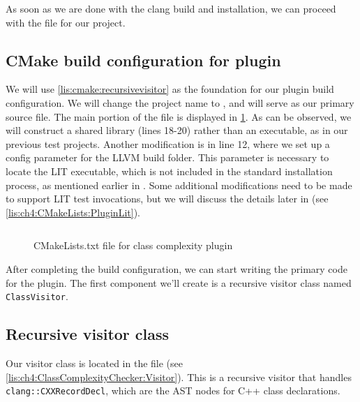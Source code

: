 As soon as we are done with the clang build and installation, we can proceed
with the  file for our project. 

\subsection{CMake build configuration for plugin}
We will use \cref{lis:cmake:recursivevisitor} as the foundation for our
plugin build configuration. We will change the project name to
, and  will serve as
our primary source file. The main portion of the file is displayed in
\cref{lis:ch4:CMakeLists:Plugin}. As can be observed, we will construct a
shared library (lines 18-20) rather than an executable, as in our previous test
projects. Another modification is in line 12, where we set up a config parameter
for the LLVM build folder. This parameter is necessary to locate the LIT
executable, which is not included in the standard  installation process, as
mentioned earlier in . Some additional modifications need
to be made to support LIT test invocations, but we will discuss the details
later in  (see
\cref{lis:ch4:CMakeLists:PluginLit}).  

\begin{figure}[H]
  \inputminted[highlightlines={12,18-20}, firstline=8, lastline=28]{cmake}{src/part1/ch4_baselibs/classcomplexity/CMakeLists.txt}
  \caption{CMakeLists.txt file for class complexity plugin}
  \label{lis:ch4:CMakeLists:Plugin}
\end{figure}

After completing the build configuration, we can start writing the primary code
for the plugin. The first component we'll create is a recursive visitor class
named \texttt{ClassVisitor}. 

\subsection{Recursive visitor class}
Our visitor class is located in the file  (see
\cref{lis:ch4:ClassComplexityChecker:Visitor}). This is a recursive visitor that
handles \texttt{clang::CXXRecordDecl}, which are the AST nodes for C++
class declarations. 

